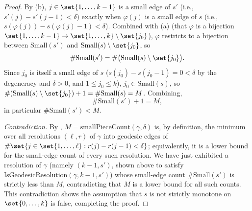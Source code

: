 \begin{proof}
  By (b), $j \in \set{1,\dots,k-1}$ is a small edge of $s'$ (i.e., $s'(j)-s'(j-1)<\delta$) exactly
  when $\varphi(j)$ is a small edge of $s$ (i.e., $s(\varphi(j))-s(\varphi(j)-1)<\delta$). Combined
  with (a) (that $\varphi$ is a bijection $\set{1,\dots,k-1} \to
  \set{1,\dots,k}\setminus\set{j_0}$), $\varphi$ restricts to a bijection between
  $\mathrm{Small}(s')$ and $\mathrm{Small}(s) \setminus \set{j_0}$, so
  \[
    \#\mathrm{Small}(s') = \#\bigl(\mathrm{Small}(s)\setminus\set{j_0}\bigr)
    .
  \]
  Since $j_0$ is itself a small edge of $s$ ($s(j_0)-s(j_0-1)=0<\delta$ by the degeneracy and
  $\delta>0$, and $1\le j_0\le k$), $j_0 \in \mathrm{Small}(s)$, so
  $\#(\mathrm{Small}(s)\setminus\set{j_0}) + 1 = \#\mathrm{Small}(s) = M$. Combining,
  \[
    \#\mathrm{Small}(s') + 1 = M
    ,
  \]
  in particular $\#\mathrm{Small}(s') < M$.

  \emph{Contradiction.} By , $M = \mathrm{smallPieceCount}(\gamma,\delta)$
  is, by definition, the minimum over all resolutions $(\ell,r)$ of $\gamma$ into geodesic edges
  of $\#\set{j \in \set{1,\dots,\ell} : r(j)-r(j-1)<\delta}$; equivalently, it is a lower bound for
  the small-edge count of every such resolution. We have just exhibited a resolution of $\gamma$
  (namely $(k-1,s')$, shown above to satisfy $\mathrm{IsGeodesicResolution}(\gamma,k-1,s')$) whose
  small-edge count $\#\mathrm{Small}(s')$ is strictly less than $M$, contradicting that $M$ is a
  lower bound for all such counts. This contradiction shows the assumption that $s$ is not
  strictly monotone on $\set{0,\dots,k}$ is false, completing the proof.
\end{proof}
